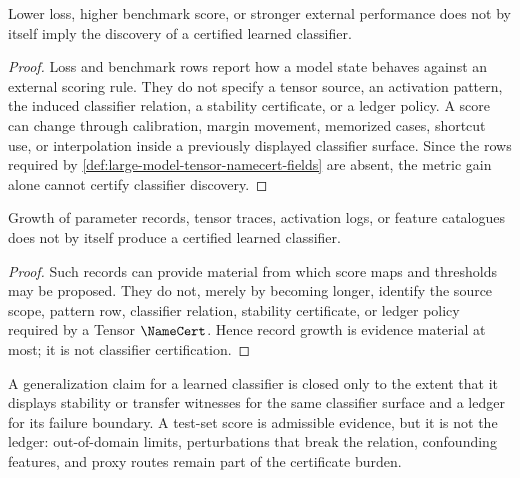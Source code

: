 \begin{theorem}
\label{thm:large-model-metric-gain-not-classifier-discovery}
Lower loss, higher benchmark score, or stronger external performance
does not by itself imply the discovery of a certified learned classifier.
\end{theorem}

\begin{proof}
Loss and benchmark rows report how a model state behaves against an
external scoring rule. They do not specify a tensor source, an activation
pattern, the induced classifier relation, a stability certificate, or a
ledger policy. A score can change through calibration, margin movement,
memorized cases, shortcut use, or interpolation inside a previously
displayed classifier surface. Since the rows required by
\autoref{def:large-model-tensor-namecert-fields} are absent, the metric
gain alone cannot certify classifier discovery.
\end{proof}

\begin{theorem}
\label{thm:large-model-record-growth-not-classifier-certification}
Growth of parameter records, tensor traces, activation logs, or feature
catalogues does not by itself produce a certified learned classifier.
\end{theorem}

\begin{proof}
Such records can provide material from which score maps and thresholds
may be proposed. They do not, merely by becoming longer, identify the
source scope, pattern row, classifier relation, stability certificate, or
ledger policy required by a Tensor $\NameCert$. Hence record growth is
evidence material at most; it is not classifier certification.
\end{proof}

\begin{principle}
\label{prin:large-model-generalization-stability-ledger}
A generalization claim for a learned classifier is closed only to the
extent that it displays stability or transfer witnesses for the same
classifier surface and a ledger for its failure boundary. A test-set
score is admissible evidence, but it is not the ledger: out-of-domain
limits, perturbations that break the relation, confounding features, and
proxy routes remain part of the certificate burden.
\end{principle}

